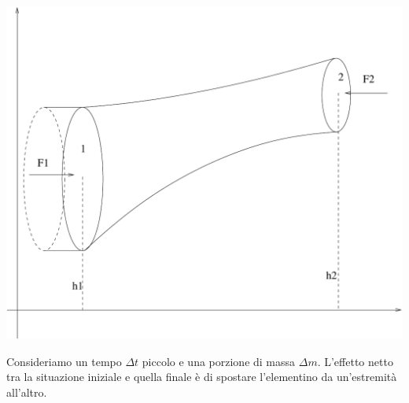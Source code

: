 \begin{center}
\includegraphics[scale=0.4]{immagini/fisica1/Bernoulli}
\end{center}
Consideriamo un tempo $\Delta t$ piccolo e una porzione di massa $\Delta m$. L'effetto netto tra la situazione iniziale e quella finale è di spostare l'elementino da un'estremità all'altro.

